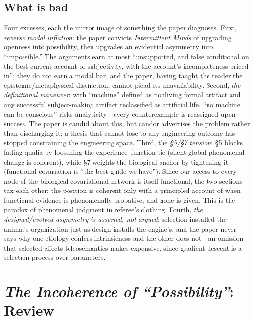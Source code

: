 \documentclass[11pt]{article}
\newcommand{\IM}{\emph{Intermittent Minds}}
\newcommand{\IC}{\emph{The Incoherence of ``Possibility''}}
\begin{document}
\subsection{What is bad}
Four excesses, each the mirror image of something the paper diagnoses. First, \emph{reverse modal inflation}: the paper convicts \IM{} of upgrading openness into possibility, then upgrades an evidential asymmetry into ``impossible.'' The arguments earn at most ``unsupported, and false conditional on the best current account of subjectivity, with the account's incompleteness priced in''; they do not earn a modal bar, and the paper, having taught the reader the epistemic/metaphysical distinction, cannot plead its unavailability. Second, \emph{the definitional maneuver}: with ``machine'' defined as nonliving formal artifact and any successful subject-making artifact reclassified as artificial life, ``no machine can be conscious'' risks analyticity---every counterexample is reassigned upon success. The paper is candid about this, but candor advertises the problem rather than discharging it; a thesis that cannot lose to any engineering outcome has stopped constraining the engineering space. Third, the \emph{\S 5/\S 7 tension}: \S 5 blocks fading qualia by loosening the experience--function tie (silent global phenomenal change is coherent), while \S 7 weights the biological anchor by tightening it (functional covariation is ``the best guide we have''). Since our access to every node of the biological covariational network is itself functional, the two sections tax each other; the position is coherent only with a principled account of when functional evidence is phenomenally probative, and none is given. This is the paradox of phenomenal judgment in referee's clothing. Fourth, \emph{the designed/evolved asymmetry is asserted, not argued}: selection installed the animal's organization just as design installs the engine's, and the paper never says why one etiology confers intrinsicness and the other does not---an omission that selected-effects teleosemantics makes expensive, since gradient descent is a selection process over parameters.

\section{\IC{}: Review}
\end{document}
